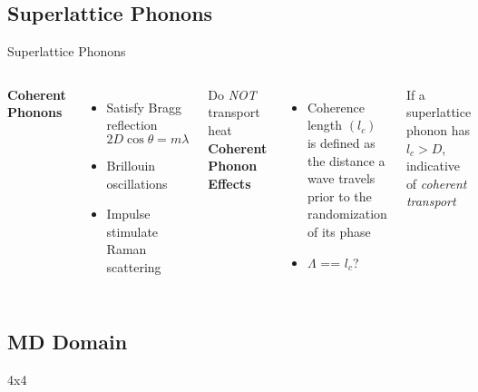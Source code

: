 \documentclass{beamer}
\begin{document}
\subsection{Superlattice Phonons}
\begin{frame}{Superlattice Phonons}
\begin{columns}
\textbf{Coherent Phonons}
\begin{itemize}
\item Satisfy Bragg reflection
\begin{equation*}\label{EQ:Coh}
2D \cos \theta = m \lambda
\end{equation*}
\item Brillouin oscillations
\item Impulse stimulate Raman scattering
\end{itemize}
Do \textit{NOT} transport heat
\textbf{Coherent Phonon Effects}
\begin{itemize}
\item Coherence length $(l_c)$ is defined as the distance a wave travels prior to the randomization of its phase
\item $\Lambda$ == $l_c$?
\end{itemize}
If a superlattice phonon has $l_c>D$, indicative of \textit{coherent transport}
\end{columns}
\end{frame}

\subsection{MD Domain}
\begin{frame}{\small{4x4}}
\begin{figure}[!h]
\vspace*{-0.5cm}
\begin{center}
\renewcommand{\figure}{Fig.}
\end{center}
\end{figure}
\begin{figure}[!h]
\vspace*{-0.25cm}
\begin{center}
\label{fig:mixed}
\end{center}
\end{figure}
\end{frame}
\end{document}
